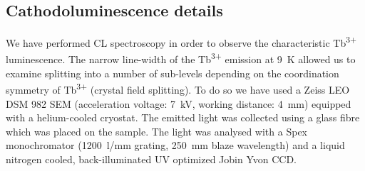 \documentclass[%
aip,
rsi,%
 amsmath,amssymb,%
 reprint,%
]{revtex4-1}
\begin{document}
\subsection{Cathodoluminescence details}
\label{sec:CL}
We have performed CL spectroscopy in order to observe the characteristic Tb\textsuperscript{3+} luminescence. The narrow line-width of the Tb\textsuperscript{3+} emission at 9~K allowed us to examine splitting into a number of sub-levels depending on the coordination symmetry of Tb\textsuperscript{3+} (crystal field splitting). To do so we have used a Zeiss LEO DSM 982 SEM \cite{Schirra2007} (acceleration voltage: 7~kV,  working distance: 4~mm) equipped with a helium-cooled cryostat. The emitted light was collected using a glass fibre which was placed on the sample. The light was analysed with a Spex monochromator (1200~l/mm grating, 250~mm blaze wavelength) and a liquid nitrogen cooled, back-illuminated UV optimized Jobin Yvon CCD.
\end{document}
